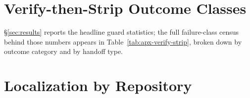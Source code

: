 \begin{table}[H]
\centering
\footnotesize
\caption{\textbf{The gate threshold sweep.}
Raising $\theta$ pushes tasks off the cheapest fixer onto more expensive ones:
cost per task rises monotonically while the solve count ceases to be exactly
measurable, since diverted tasks lack a with-handoff outcome on their new
fixer.  The operating point $\theta{=}0.30$ routes all but three tasks to
\fxkimi and is the last threshold at which every number is exact.}
\label{tab:apx-theta-sweep}

\end{table}



\section{Verify-then-Strip Outcome Classes}
\label{apx:verify-strip}

\S\ref{sec:results} reports the headline guard statistics; the full
failure-class census behind those numbers appears in
Table~\ref{tab:apx-verify-strip}, broken down by outcome category and by
handoff type.

\begin{table}[H]
\centering
\footnotesize
\caption{\textbf{What the verify-then-strip sandbox found in 266 handoffs.}
\emph{Top:} outcome class of each reproduction claim, replayed before any
fixer saw it ($50$ genuine, $174$ false and stripped).  \emph{Bottom:}
split by handoff type; spontaneous handoffs are more than twice as likely
to be genuine as forced ones (never pooled).  Forced-handoff percentages
use the $43$ of $60$ that claim a reproduction as their denominator.
The label-run row shows the same measurement on an earlier, easier task
set.}
\label{tab:apx-verify-strip}

\end{table}



\section{Localization by Repository}
\label{apx:localization}

